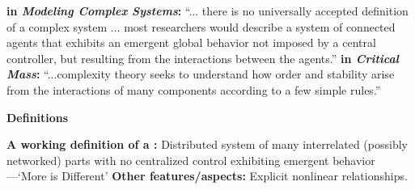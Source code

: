   \textbf{
       in \textit{Modeling Complex Systems}:}\cite{boccara2004a}
    ``... there is no universally accepted definition
    of a complex system ... most researchers would describe
    a system of connected agents that exhibits
    an emergent global behavior not imposed by a central
    controller, but resulting from the interactions between
    the agents.''
  \textbf{ in \textit{Critical Mass}:}\cite{ball2004a}
    ``...complexity theory seeks to understand how order and 
    stability arise from the interactions of many components
    according to a few simple rules.''


  \textbf{Definitions}


  \textbf{A working definition of a :}
      Distributed system of many interrelated (possibly networked) parts
      with no centralized control
      exhibiting 
      emergent behavior---`More is Different'\cite{anderson1972a}
  \textbf{Other features/aspects:}
      Explicit nonlinear relationships.
    
